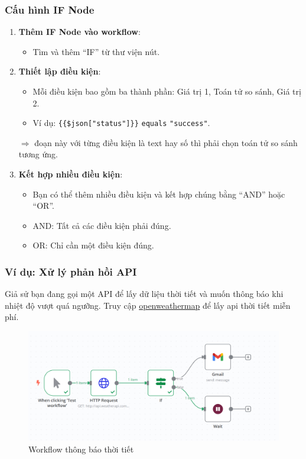 \newpage

\subsubsection{Cấu hình IF Node}

\begin{enumerate}
  \item \textbf{Thêm IF Node vào workflow}:
  \begin{itemize}
    \item Tìm và thêm ``IF'' từ thư viện nút.
  \end{itemize}

  \item \textbf{Thiết lập điều kiện}:
  \begin{itemize}
    \item Mỗi điều kiện bao gồm ba thành phần: Giá trị 1, Toán tử so sánh, Giá trị 2.
    \item Ví dụ: \texttt{\{\{\$json["status"]\}\}} \texttt{equals} \texttt{"success"}.
  \end{itemize}
$\Rightarrow$  đoạn này với từng điều kiện là text hay số thì phải chọn toán tử so sánh tương ứng.
  \item \textbf{Kết hợp nhiều điều kiện}:
  \begin{itemize}
    \item Bạn có thể thêm nhiều điều kiện và kết hợp chúng bằng ``AND'' hoặc ``OR''.
    \item AND: Tất cả các điều kiện phải đúng.
    \item OR: Chỉ cần một điều kiện đúng.
  \end{itemize}
\end{enumerate}

\subsubsection{Ví dụ: Xử lý phản hồi API}

Giả sử bạn đang gọi một API để lấy dữ liệu thời tiết và muốn thông báo khi nhiệt độ vượt quá ngưỡng. Truy cập \href{https://www.weatherapi.com/my/}{openweathermap} để lấy api thời tiết miễn phí. 

\begin{figure}[htbp]
    \centering
    \includegraphics[width=1\linewidth]{Chap1-7/weather.pdf}
    \caption{Workflow thông báo thời tiết}
\end{figure} 

